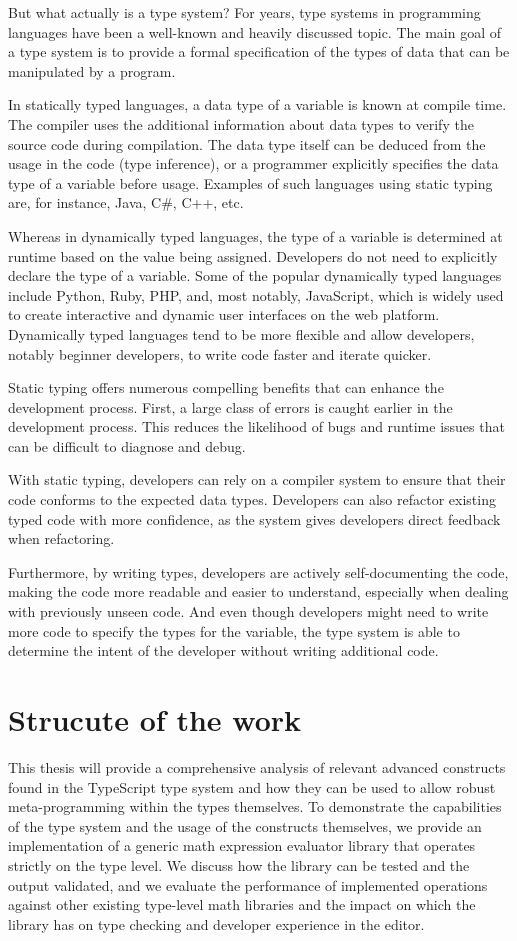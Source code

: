 But what actually is a type system? For years, type systems in programming languages have been a well-known and heavily discussed topic. The main goal of a type system is to provide a formal specification of the types of data that can be manipulated by a program.

In statically typed languages, a data type of a variable is known at compile time. The compiler uses the additional information about data types to verify the source code during compilation. The data type itself can be deduced from the usage in the code (type inference), or a programmer explicitly specifies the data type of a variable before usage. Examples of such languages using static typing are, for instance, Java, C\#, C++, etc.

Whereas in dynamically typed languages, the type of a variable is determined at runtime based on the value being assigned. Developers do not need to explicitly declare the type of a variable. Some of the popular dynamically typed languages include Python, Ruby, PHP, and, most notably, JavaScript, which is widely used to create interactive and dynamic user interfaces on the web platform. Dynamically typed languages tend to be more flexible and allow developers, notably beginner developers, to write code faster and iterate quicker.

Static typing offers numerous compelling benefits that can enhance the development process. First, a large class of errors is caught earlier in the development process. This reduces the likelihood of bugs and runtime issues that can be difficult to diagnose and debug. 

With static typing, developers can rely on a compiler system to ensure that their code conforms to the expected data types. Developers can also refactor existing typed code with more confidence, as the system gives developers direct feedback when refactoring. 

Furthermore, by writing types, developers are actively self-documenting the code, making the code more readable and easier to understand, especially when dealing with previously unseen code. And even though developers might need to write more code to specify the types for the variable, the type system is able to determine the intent of the developer without writing additional code. 

\section{Strucute of the work}

This thesis will provide a comprehensive analysis of relevant advanced constructs found in the TypeScript type system and how they can be used to allow robust meta-programming within the types themselves. To demonstrate the capabilities of the type system and the usage of the constructs themselves, we provide an implementation of a generic math expression evaluator library that operates strictly on the type level. We discuss how the library can be tested and the output validated, and we evaluate the performance of implemented operations against other existing type-level math libraries and the impact on which the library has on type checking and developer experience in the editor.